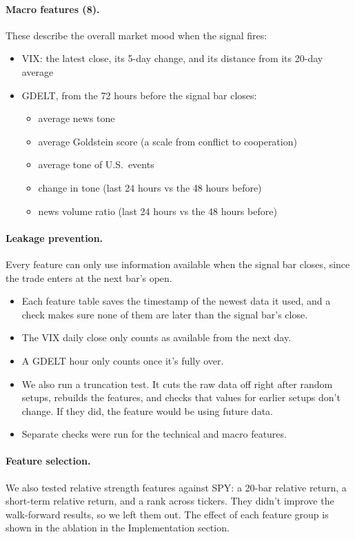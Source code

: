 \paragraph{Macro features (8).} These describe the overall market mood when the signal fires:
\begin{itemize}
  \item VIX: the latest close, its 5-day change, and its distance from its 20-day average
  \item GDELT, from the 72 hours before the signal bar closes:
  \begin{itemize}
    \item average news tone
    \item average Goldstein score (a scale from conflict to cooperation)
    \item average tone of U.S.\ events
    \item change in tone (last 24 hours vs the 48 hours before)
    \item news volume ratio (last 24 hours vs the 48 hours before)
  \end{itemize}
\end{itemize}

\paragraph{Leakage prevention.} Every feature can only use information available when the signal bar closes, since the trade enters at the next bar's open.
\begin{itemize}
  \item Each feature table saves the timestamp of the newest data it used, and a check makes sure none of them are later than the signal bar's close.
  \item The VIX daily close only counts as available from the next day.
  \item A GDELT hour only counts once it's fully over.
  \item We also run a truncation test. It cuts the raw data off right after random setups, rebuilds the features, and checks that values for earlier setups don't change. If they did, the feature would be using future data.
  \item Separate checks were run for the technical and macro features.
\end{itemize}

\paragraph{Feature selection.} We also tested relative strength features against SPY: a 20-bar relative return, a short-term relative return, and a rank across tickers. They didn't improve the walk-forward results, so we left them out. The effect of each feature group is shown in the ablation in the Implementation section.

